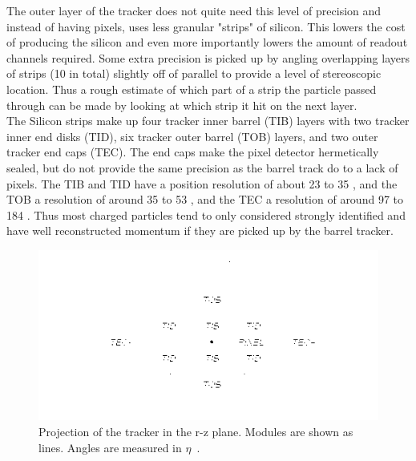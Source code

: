	The outer layer of the tracker does not quite need this level of precision and instead of having pixels, uses less granular "strips" of silicon. This lowers the cost of producing the silicon and even more importantly lowers the amount of readout channels required. Some extra precision is picked up by angling overlapping layers of strips (10 in total) slightly off of parallel to provide a level of stereoscopic location. Thus a rough estimate of which part of a strip the particle passed through can be made by looking at which strip it hit on the next layer.\\
	
	The Silicon strips make up four tracker inner barrel (TIB) layers with two tracker inner end disks (TID), six tracker outer barrel (TOB) layers, and two outer tracker end caps (TEC). The end caps make the pixel detector hermetically sealed, but do not provide the same precision as the barrel track do to a lack of pixels. The TIB and TID have a position resolution of about 23 to 35 \um, and the TOB a resolution of around 35 to 53 \um, and the TEC a resolution of around 97 to 184 \um. Thus most charged particles tend to only considered strongly identified and have well reconstructed momentum if they are picked up by the barrel tracker.\\
	
						\begin{figure}[h]
\begin{center}
\includegraphics[width=0.8\linewidth]{Figs/tracker_layout.png}
\caption{\label{fig:tracker}
Projection of the tracker in the r-z plane. Modules are shown as lines. Angles are measured in $\eta$~\cite{trackingperformance}.
}
\end{center}
\end{figure}
	
